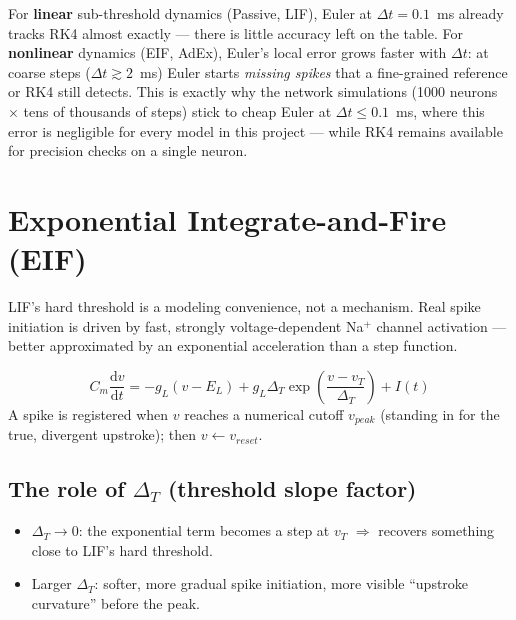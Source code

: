 \documentclass[11pt,a4paper]{article}
\newcommand{\dd}{\mathrm{d}}
\begin{document}
\begin{keybox}
For \textbf{linear} sub-threshold dynamics (Passive, LIF), Euler at $\Delta t=0.1$~ms already tracks RK4 almost exactly — there is little accuracy left on the table. For \textbf{nonlinear} dynamics (EIF, AdEx), Euler's local error grows faster with $\Delta t$: at coarse steps ($\Delta t \gtrsim 2$~ms) Euler starts \emph{missing spikes} that a fine-grained reference or RK4 still detects. This is exactly why the network simulations (1000 neurons $\times$ tens of thousands of steps) stick to cheap Euler at $\Delta t \le 0.1$~ms, where this error is negligible for every model in this project — while RK4 remains available for precision checks on a single neuron.
\end{keybox}

\section{Exponential Integrate-and-Fire (EIF)}
LIF's hard threshold is a modeling convenience, not a mechanism. Real spike initiation is driven by fast, strongly voltage-dependent Na$^+$ channel activation — better approximated by an exponential acceleration than a step function.

\begin{eqbox}
$$C_m \frac{\dd v}{\dd t} = -g_L(v - E_L) + g_L \Delta_T \exp\!\left(\frac{v - v_T}{\Delta_T}\right) + I(t)$$
A spike is registered when $v$ reaches a numerical cutoff $v_{peak}$ (standing in for the true, divergent upstroke); then $v \leftarrow v_{reset}$.
\end{eqbox}

\subsection{The role of \texorpdfstring{$\Delta_T$}{Delta\_T} (threshold slope factor)}
\begin{itemize}[itemsep=2pt]
  \item $\Delta_T \to 0$: the exponential term becomes a step at $v_T$ $\Rightarrow$ recovers something close to LIF's hard threshold.
  \item Larger $\Delta_T$: softer, more gradual spike initiation, more visible ``upstroke curvature'' before the peak.
\end{itemize}
\end{document}
